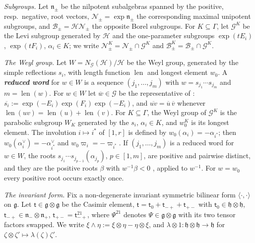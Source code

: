 \documentclass[a4paper]{amsart}
\numberwithin{equation}{section}
\theoremstyle{definition}
\theoremstyle{remark}
\newcommand{\mfh}{\mathfrak{h}}
\newcommand{\mfg}{\mathfrak{g}}
\newcommand{\mfn}{\mathfrak{n}}
\newcommand{\mcG}{\mathcal{G}}
\newcommand{\mcH}{\mathcal{H}}
\newcommand{\mcN}{\mathcal{N}}
\newcommand{\mcB}{\mathcal{B}}
\newcommand{\Kil}[2]{\langle #1, #2\rangle}
\newcommand{\len}{\operatorname{len}}
\newcommand{\Cas}{\mathsf t}
\newcommand{\newword}[1]{\textbf{\emph{#1}}}
\begin{document}
\emph{Subgroups.}
Let $\mfn_\pm$ be the nilpotent subalgebras spanned by the positive, resp.\ negative, root vectors, $\mcN_\pm=\exp\mfn_\pm$ the corresponding maximal unipotent subgroups, and $\mcB_\pm=\mcH\mcN_\pm$ the opposite Borel subgroups.
For $K\subseteq\Gamma$, let $\mcG^K$ be the Levi subgroup generated by $\mcH$ and the one-parameter subgroups $\exp(tE_i)$, $\exp(tF_i)$, $\alpha_i\in K$; we write $\mcN_\pm^K=\mcN_\pm\cap\mcG^K$ and $\mcB_\pm^K=\mcB_\pm\cap\mcG^K$.

\emph{The Weyl group.}
Let $W=N_\mcG(\mcH)/\mcH$ be the Weyl group, generated by the simple reflections $s_i$, with length function $\len$ and longest element $w_0$.
A \newword{reduced word} for $w\in W$ is a sequence $(j_1,\dots,j_m)$ with $w=s_{j_1}\cdots s_{j_m}$ and $m=\len(w)$.
For $w\in W$ let $\overline{w}\in\mcG$ be the representative of \cite[Section~1.4]{FZ99}: $\overline{s_i}:=\exp(-E_i)\exp(F_i)\exp(-E_i)$, and $\overline{uv}=\overline{u}\,\overline{v}$ whenever $\len(uv)=\len(u)+\len(v)$.
For $K\subseteq\Gamma$, the Weyl group of $\mcG^K$ is the parabolic subgroup $W_K$ generated by the $s_i$, $\alpha_i\in K$, and $w_0^K$ is its longest element.
The involution $i\mapsto i^*$ of $[1,r]$ is defined by $w_0(\alpha_i)=-\alpha_{i^*}$; then $w_0(\alpha_i^\vee)=-\alpha_{i^*}^\vee$ and $w_0\varpi_i=-\varpi_{i^*}$.
If $(j_1,\dots,j_m)$ is a reduced word for $w\in W$, the roots $s_{j_1}\cdots s_{j_{p-1}}(\alpha_{j_p})$, $p\in[1,m]$, are positive and pairwise distinct, and they are the positive roots $\beta$ with $w^{-1}\beta<0$ \cite[Chapter~VI, Section~1.6, Corollary~2 of Proposition~17]{Bou02}, applied to $w^{-1}$.
  For $w=w_0$ every positive root occurs exactly once.

\emph{The invariant form.}
Fix a non-degenerate invariant symmetric bilinear form $\Kil{\cdot}{\cdot}$ on $\mfg$.
Let $\Cas\in\mfg\otimes\mfg$ be the Casimir element, $\Cas=\Cas_0+\Cas_{-+}+\Cas_{+-}$ with $\Cas_0\in\mfh\otimes\mfh$, $\Cas_{-+}\in\mfn_-\otimes\mfn_+$, $\Cas_{+-}=\Cas_{-+}^{21}$, where $\Psi^{21}$ denotes $\Psi\in\mfg\otimes\mfg$ with its two tensor factors swapped.
We write $\xi\wedge\eta:=\xi\otimes\eta-\eta\otimes\xi$, and $\lambda\otimes1:\mfh\otimes\mfh\to\mfh$ for $\zeta\otimes\zeta'\mapsto\lambda(\zeta)\zeta'$.
\end{document}

